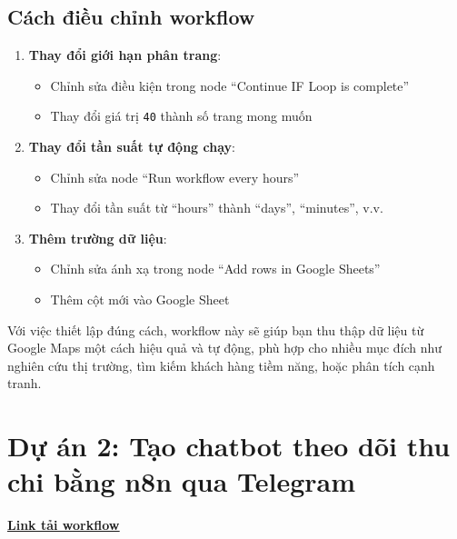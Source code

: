 \subsection{Cách điều chỉnh workflow}

\begin{enumerate}
  \item \textbf{Thay đổi giới hạn phân trang}:
  \begin{itemize}
    \item Chỉnh sửa điều kiện trong node ``Continue IF Loop is complete''
    \item Thay đổi giá trị \texttt{40} thành số trang mong muốn
  \end{itemize}

  \item \textbf{Thay đổi tần suất tự động chạy}:
  \begin{itemize}
    \item Chỉnh sửa node ``Run workflow every hours''
    \item Thay đổi tần suất từ ``hours'' thành ``days'', ``minutes'', v.v.
  \end{itemize}

  \item \textbf{Thêm trường dữ liệu}:
  \begin{itemize}
    \item Chỉnh sửa ánh xạ trong node ``Add rows in Google Sheets''
    \item Thêm cột mới vào Google Sheet
  \end{itemize}
\end{enumerate}

Với việc thiết lập đúng cách, workflow này sẽ giúp bạn thu thập dữ liệu từ Google Maps một cách hiệu quả và tự động, phù hợp cho nhiều mục đích như nghiên cứu thị trường, tìm kiếm khách hàng tiềm năng, hoặc phân tích cạnh tranh.

\clearpage
\section{\textbf{Dự án 2: Tạo chatbot theo dõi thu chi bằng n8n qua Telegram }}

\href{https://drive.google.com/drive/folders/1tumFktBej5fgHsKSuYDtnL2V0W5OI9nk?usp=sharing}{\textbf{\underline {Link tải workflow}}}


